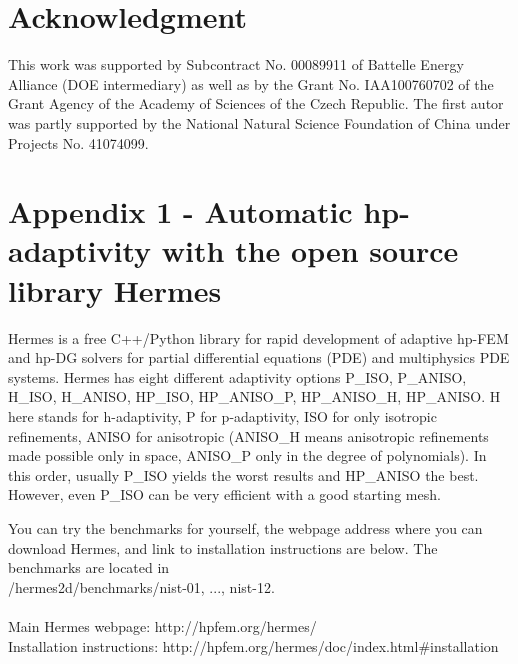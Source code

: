 \documentclass[12pt]{elsarticle}
\begin{document}
\section{Acknowledgment}

This work was supported by Subcontract No. 00089911 of Battelle
Energy Alliance (DOE intermediary) as well as by the
Grant No. IAA100760702 of the Grant Agency of the Academy
of Sciences of the Czech Republic. The first autor was partly
supported by the National Natural Science Foundation
of China under Projects No. 41074099.

\section{Appendix 1 - Automatic hp-adaptivity with the open source library Hermes}
Hermes is a free C++/Python library for rapid development of adaptive hp-FEM and hp-DG solvers for partial differential equations (PDE) and multiphysics PDE systems. Hermes has eight different adaptivity options P\_ISO, P\_ANISO, H\_ISO, H\_ANISO, HP\_ISO, HP\_ANISO\_P, HP\_ANISO\_H, HP\_ANISO. H here stands for h-adaptivity, P for p-adaptivity, ISO for only isotropic refinements, ANISO for anisotropic (ANISO\_H means anisotropic refinements made possible only in space, ANISO\_P only in the degree of polynomials). In this order, usually P\_ISO yields the worst results and HP\_ANISO the best. However, even P\_ISO can be very efficient with a good starting mesh.

You can try the benchmarks for yourself, the webpage address where you can download Hermes, and link to installation instructions are below. The benchmarks are located in\\
/hermes2d/benchmarks/nist-01, ..., nist-12.
\\ \\
Main Hermes webpage: http://hpfem.org/hermes/\\
Installation instructions: \small{http://hpfem.org/hermes/doc/index.html\#installation}





\end{document}
